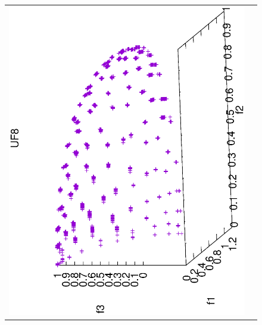\begin{figure}[H]
\begin{tabular}{cc}
 \includegraphics[scale=0.3, angle=-90,origin=c]{Figures_Chapter7/Results_Chapter4/Summary_Representative/VSD-MOEA-D/UF8.eps} \\

\end{tabular}
\end{figure}
